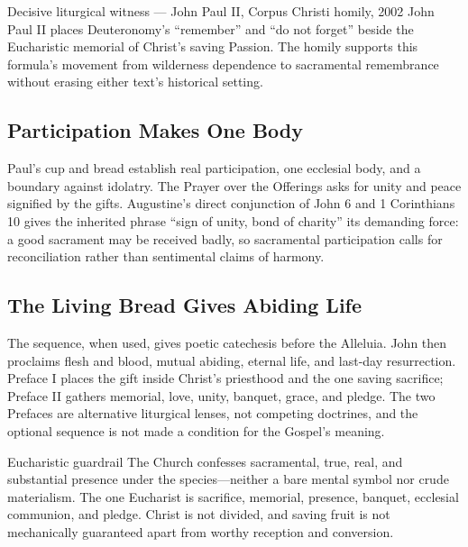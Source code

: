\begin{deepstudy}
\begin{sourcecard}{Decisive liturgical witness --- John Paul II, Corpus Christi homily, 2002}
John Paul II places Deuteronomy's “remember” and “do not forget” beside the Eucharistic memorial of Christ's saving Passion. The homily supports this formula's movement from wilderness dependence to sacramental remembrance without erasing either text's historical setting.
\end{sourcecard}

\subsection*{Participation Makes One Body\enspace{}}

Paul's cup and bread establish real participation, one ecclesial body, and a boundary against idolatry. The Prayer over the Offerings asks for unity and peace signified by the gifts. Augustine's direct conjunction of John 6 and 1 Corinthians 10 gives the inherited phrase “sign of unity, bond of charity” its demanding force: a good sacrament may be received badly, so sacramental participation calls for reconciliation rather than sentimental claims of harmony.

\subsection*{The Living Bread Gives Abiding Life\enspace{}}

The sequence, when used, gives poetic catechesis before the Alleluia. John then proclaims flesh and blood, mutual abiding, eternal life, and last-day resurrection. Preface I places the gift inside Christ's priesthood and the one saving sacrifice; Preface II gathers memorial, love, unity, banquet, grace, and pledge. The two Prefaces are alternative liturgical lenses, not competing doctrines, and the optional sequence is not made a condition for the Gospel's meaning.

\begin{studybox}{Eucharistic guardrail}
The Church confesses sacramental, true, real, and substantial presence under the species---neither a bare mental symbol nor crude materialism. The one Eucharist is sacrifice, memorial, presence, banquet, ecclesial communion, and pledge. Christ is not divided, and saving fruit is not mechanically guaranteed apart from worthy reception and conversion.
\end{studybox}


\end{deepstudy}
